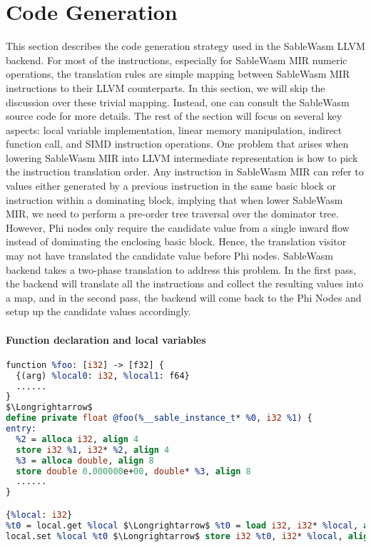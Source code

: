 \section{Code Generation}

This section describes the code generation strategy used in the SableWasm LLVM backend. For most of the instructions, especially for SableWasm MIR numeric operations, the translation rules are simple mapping between SableWasm MIR instructions to their LLVM counterparts. In this section, we will skip the discussion over these trivial mapping. Instead, one can consult the SableWasm source code for more details. The rest of the section will focus on several key aspects: local variable implementation, linear memory manipulation, indirect function call, and SIMD instruction operations. One problem that arises when lowering SableWasm MIR into LLVM intermediate representation is how to pick the instruction translation order. Any instruction in SableWasm MIR can refer to values either generated by a previous instruction in the same basic block or instruction within a dominating block, implying that when lower SableWasm MIR, we need to perform a pre-order tree traversal over the dominator tree. However, Phi nodes only require the candidate value from a single inward flow instead of dominating the enclosing basic block. Hence, the translation visitor may not have translated the candidate value before Phi nodes. SableWasm backend takes a two-phase translation to address this problem. In the first pass, the backend will translate all the instructions and collect the resulting values into a map, and in the second pass, the backend will come back to the Phi Nodes and setup up the candidate values accordingly.

\paragraph{Function declaration and local variables} \quad
\begin{lstlisting}[basicstyle=\linespread{0.9}\small\ttfamily, language=LLVM, mathescape=true]
function %foo: [i32] -> [f32] {
  {(arg) %local0: i32, %local1: f64} 
  ......
}
$\Longrightarrow$
define private float @foo(%__sable_instance_t* %0, i32 %1) {
entry:
  %2 = alloca i32, align 4
  store i32 %1, i32* %2, align 4
  %3 = alloca double, align 8
  store double 0.000000e+00, double* %3, align 8
  ......
}

{%local: i32} 
%t0 = local.get %local $\Longrightarrow$ %t0 = load i32, i32* %local, align 4
local.set %local %t0 $\Longrightarrow$ store i32 %t0, i32* %local, align 4
\end{lstlisting}

